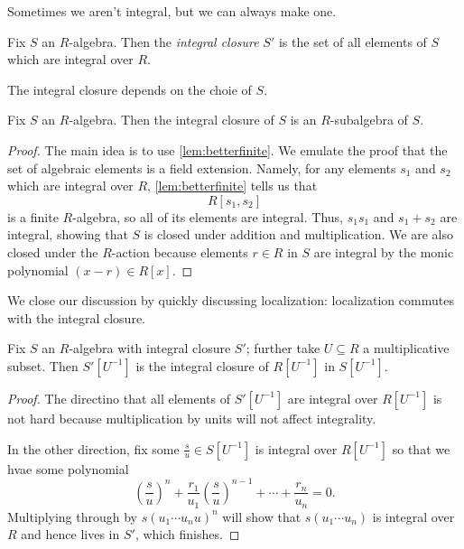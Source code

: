 Sometimes we aren't integral, but we can always make one.
\begin{definition}
	Fix $S$ an $R$-algebra. Then the \textit{integral closure} $S'$ is the set of all elements of $S$ which are integral over $R$.
\end{definition}
\begin{remark}
	The integral closure depends on the choie of $S$.
\end{remark}
\begin{proposition}
	Fix $S$ an $R$-algebra. Then the integral closure of $S$ is an $R$-subalgebra of $S$.
\end{proposition}
\begin{proof}
	The main idea is to use \autoref{lem:betterfinite}. We emulate the proof that the set of algebraic elements is a field extension. Namely, for any elements $s_1$ and $s_2$ which are integral over $R$, \autoref{lem:betterfinite} tells us that
	\[R[s_1,s_2]\]
	is a finite $R$-algebra, so all of its elements are integral. Thus, $s_1s_1$ and $s_1+s_2$ are integral, showing that $S$ is closed under addition and multiplication. We are also closed under the $R$-action because elements $r\in R$ in $S$ are integral by the monic polynomial $(x-r)\in R[x]$.
\end{proof}
We close our discussion by quickly discussing localization: localization commutes with the integral closure.
\begin{proposition}
	Fix $S$ an $R$-algebra with integral closure $S'$; further take $U\subseteq R$ a multiplicative subset. Then $S'\left[U^{-1}\right]$ is the integral closure of $R\left[U^{-1}\right]$ in $S\left[U^{-1}\right]$.
\end{proposition}
\begin{proof}
	The directino that all elements of $S'\left[U^{-1}\right]$ are integral over $R\left[U^{-1}\right]$ is not hard because multiplication by units will not affect integrality.
	
	In the other direction, fix some $\frac su\in S\left[U^{-1}\right]$ is integral over $R\left[U^{-1}\right]$ so that we hvae some polynomial
	\[\left(\frac su\right)^n+\frac{r_1}{u_1}\left(\frac su\right)^{n-1}+\cdots+\frac{r_n}{u_n}=0.\]
	Multiplying through by $s(u_1\cdots u_nu)^n$ will show that $s(u_1\cdots u_n)$ is integral over $R$ and hence lives in $S'$, which finishes.
\end{proof}

